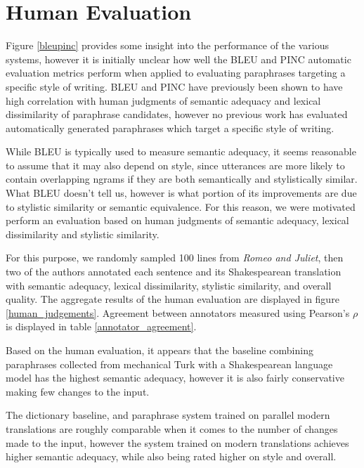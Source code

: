 \documentclass[10pt,a5paper,twoside]{article}
\begin{document}
\section{Human Evaluation}
\label{human_evaluation}
Figure \ref{bleupinc} provides some insight into the performance of the various systems, however it is initially unclear how well the BLEU and PINC
automatic evaluation metrics perform when applied to evaluating paraphrases targeting a specific style of writing.  BLEU and PINC have previously
been shown to have high correlation with human judgments of semantic adequacy and lexical dissimilarity of paraphrase candidates, however no
previous work has evaluated automatically generated paraphrases which target a specific style of writing.

While BLEU is typically used to measure semantic adequacy, it seems reasonable to assume that it may also depend on style, since utterances
are more likely to contain overlapping ngrams if they are both semantically and stylistically similar.  What BLEU doesn't tell us, however
is what portion of its improvements are due to stylistic similarity or semantic equivalence.  For this reason, we were motivated perform
an evaluation based on human judgments of semantic adequacy, lexical dissimilarity and stylistic similarity.

For this purpose, we randomly sampled 100 lines from {\em Romeo and Juliet}, then two of the authors annotated each sentence and its Shakespearean
translation with semantic adequacy, lexical dissimilarity, stylistic similarity, and overall quality.
The aggregate results of the human evaluation are displayed in figure \ref{human_judgements}.  Agreement between annotators
measured using Pearson's $\rho$ is displayed in table \ref{annotator_agreement}.

Based on the human evaluation, it appears that the baseline combining paraphrases collected from mechanical Turk \cite{chen11} with
a Shakespearean language model has the highest semantic adequacy, however it is also fairly conservative making few changes to the input.

The dictionary baseline, and paraphrase system trained on parallel modern translations are roughly comparable when it comes to 
the number of changes made to the input, however the system trained on modern translations achieves higher semantic adequacy, while also being rated higher on style and overall.
\end{document}
